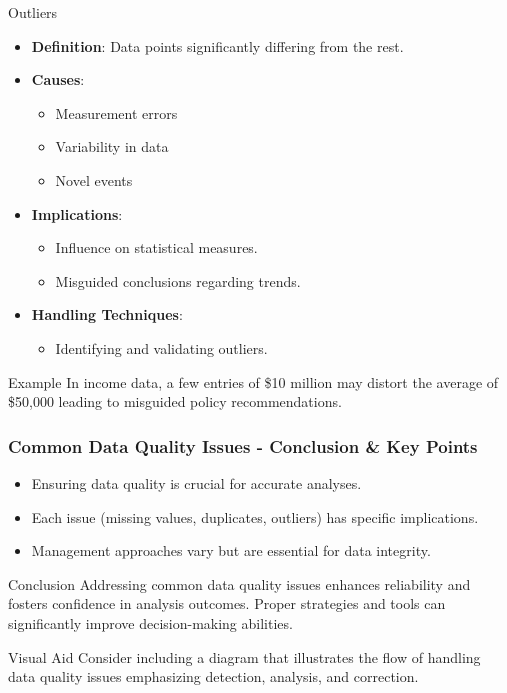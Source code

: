 \documentclass{beamer}
\begin{document}
\begin{frame}[fragile]
    \begin{block}{Outliers}
        \begin{itemize}
            \item \textbf{Definition}: Data points significantly differing from the rest.
            \item \textbf{Causes}:
                \begin{itemize}
                    \item Measurement errors
                    \item Variability in data
                    \item Novel events
                \end{itemize}
            \item \textbf{Implications}:
                \begin{itemize}
                    \item Influence on statistical measures.
                    \item Misguided conclusions regarding trends.
                \end{itemize}
            \item \textbf{Handling Techniques}:
                \begin{itemize}
                    \item Identifying and validating outliers.
                \end{itemize}
        \end{itemize}
    \end{block}
    \begin{exampleblock}{Example}
        In income data, a few entries of \$10 million may distort the average of \$50,000 leading to misguided policy recommendations.
    \end{exampleblock}
\end{frame}

\begin{frame}[fragile]
    \frametitle{Common Data Quality Issues - Conclusion & Key Points}
    \begin{itemize}
        \item Ensuring data quality is crucial for accurate analyses.
        \item Each issue (missing values, duplicates, outliers) has specific implications.
        \item Management approaches vary but are essential for data integrity.
    \end{itemize}
    
    \begin{block}{Conclusion}
        Addressing common data quality issues enhances reliability and fosters confidence in analysis outcomes. Proper strategies and tools can significantly improve decision-making abilities.
    \end{block}
    
    \begin{block}{Visual Aid}
        Consider including a diagram that illustrates the flow of handling data quality issues emphasizing detection, analysis, and correction.
    \end{block}
\end{frame}
\end{document}
